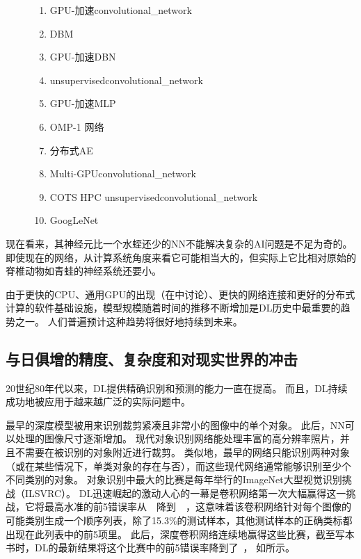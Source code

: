 \begin{figure}[!htb]
{\begin{enumerate}
  \item %
    GPU-加速\gls{convolutional_network}~\citep{chellapilla:inria-00112631}
  \item %
    \gls{DBM}~\citep{SalHinton09}
  \item %
    GPU-加速\gls{DBN}~\citep{RainaICML09}
  \item %
    \gls{unsupervised}\gls{convolutional_network}~\citep{Jarrett-ICCV2009}
  \item %
    GPU-加速\gls{MLP}~\citep{Ciresan-2010}
  \item %
    OMP-1 网络~\citep{Coates2011b}
  \item %
    分布式\gls{AE}~\citep{QuocLe-ICML2012}
  \item %
    Multi-GPU\gls{convolutional_network}~\citep{Krizhevsky-2012}
  \item %
    COTS HPC \gls{unsupervised}\gls{convolutional_network}~\citep{icml2013_coates13}
  \item %
    GoogLeNet~\citep{Szegedy-et-al-arxiv2014}
\end{enumerate}
}
\end{figure}


现在看来，其神经元比一个水蛭还少的\gls{NN}不能解决复杂的\gls{AI}问题是不足为奇的。
即使现在的网络，从计算系统角度来看它可能相当大的，但实际上它比相对原始的脊椎动物如青蛙的神经系统还要小。

由于更快的CPU、通用GPU的出现（在中讨论）、更快的网络连接和更好的分布式计算的软件基础设施，模型规模随着时间的推移不断增加是\gls{DL}历史中最重要的趋势之一。
人们普遍预计这种趋势将很好地持续到未来。


\subsection{与日俱增的精度、复杂度和对现实世界的冲击}
\label{sec:increasing_accuracy_complexity_and_real_world_impact}

20世纪80年代以来，\gls{DL}提供精确识别和预测的能力一直在提高。
而且，\gls{DL}持续成功地被应用于越来越广泛的实际问题中。

最早的深度模型被用来识别裁剪紧凑且非常小的图像中的单个对象\citep{Rumelhart86b-small}。
此后，\gls{NN}可以处理的图像尺寸逐渐增加。
现代对象识别网络能处理丰富的高分辨率照片，并且不需要在被识别的对象附近进行裁剪\citep{Krizhevsky-2012}。
类似地，最早的网络只能识别两种对象（或在某些情况下，单类对象的存在与否），而这些现代网络通常能够识别至少个不同类别的对象。
对象识别中最大的比赛是每年举行的ImageNet大型视觉识别挑战（ILSVRC）。
\gls{DL}迅速崛起的激动人心的一幕是卷积网络第一次大幅赢得这一挑战，它将最高水准的前5错误率从~~降到~~\citep{Krizhevsky-2012}，这意味着该卷积网络针对每个图像的可能类别生成一个顺序列表，除了15.3\%的测试样本，其他测试样本的正确类标都出现在此列表中的前5项里。
此后，深度卷积网络连续地赢得这些比赛，截至写本书时，\gls{DL}的最新结果将这个比赛中的前5错误率降到了~， 如所示。

